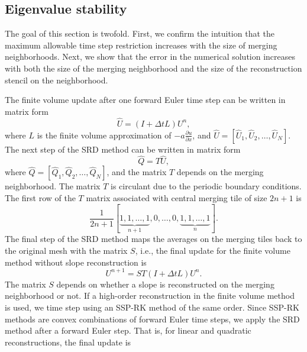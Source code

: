 \subsection{Eigenvalue stability}
The goal of this section is twofold.  First, we confirm the intuition that the maximum allowable time step restriction increases with the size of merging neighborhoods.  Next, we show that the error in the numerical solution increases with both the size of the merging neighborhood and the size of the reconstruction stencil on the neighborhood.

The finite volume update after one forward Euler time step can be written in matrix form
\begin{equation}\label{eq:L}
    \hat U = (I + \Delta t L)U^n,
\end{equation}
where $L$ is the finite volume approximation of $-a\frac{\partial u}{\partial x}$, and $\hat U = [\hat U_1, \hat U_2, \hdots, \hat U_N]$.
The next step of the SRD method can be written in matrix form
\begin{equation}\label{eq:merged_tile}
\hat Q = T\hat U,
\end{equation}
where $\hat Q = [\hat Q_1, \hat Q_2, \hdots, \hat Q_N]$, and the matrix $T$ depends on the merging neighborhood.  The matrix $T$ is circulant due to the periodic boundary conditions.  
The first row of the $T$ matrix associated with central merging tile of size $2n+1$ is
$$
\frac{1}{2n+1}[\underbrace{1, 1, \hdots,1}_{n+1}, 0, \hdots, 0,\underbrace{1, 1, \hdots, 1}_{n}].
$$
The final step of the SRD method maps the averages on the merging tiles back to the original mesh with the matrix $S$, i.e.,
the final update for the finite volume method without slope reconstruction is
$$
U^{n+1} = ST(I + \Delta t L)U^n.
$$
The matrix $S$ depends on whether a slope is reconstructed on the merging neighborhood or not.  
If a high-order reconstruction in the finite volume method is used, we time step using an SSP-RK method of the same order.  Since SSP-RK methods are convex combinations of forward Euler time steps, we apply the SRD method after a forward Euler step.  That is, for linear and quadratic reconstructions, the final update is
